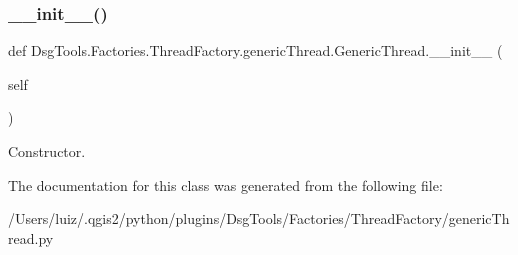 \subsubsection{\texorpdfstring{\+\_\+\+\_\+init\+\_\+\+\_\+()}{\_\_init\_\_()}}
{\footnotesize\ttfamily def Dsg\+Tools.\+Factories.\+Thread\+Factory.\+generic\+Thread.\+Generic\+Thread.\+\_\+\+\_\+init\+\_\+\+\_\+ (\begin{DoxyParamCaption}\item[{}]{self }\end{DoxyParamCaption})}

\begin{DoxyVerb}Constructor.
\end{DoxyVerb}
 

The documentation for this class was generated from the following file\+:\begin{DoxyCompactItemize}
\item 
/\+Users/luiz/.\+qgis2/python/plugins/\+Dsg\+Tools/\+Factories/\+Thread\+Factory/generic\+Thread.\+py\end{DoxyCompactItemize}
